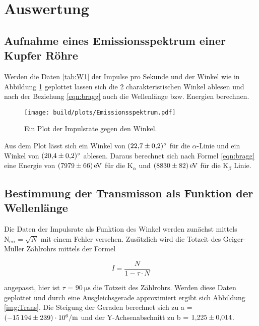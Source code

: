 \section{Auswertung}

    \subsection{Aufnahme eines Emissionsspektrum einer Kupfer Röhre}

        \noindent Werden die Daten \ref{tab:W1} der Impulse pro Sekunde und der Winkel wie in Abbildung \ref{img:Spekt} geplottet lassen sich die 2 
        charakteristischen Winkel ablesen und nach der Beziehung \ref{eqn:bragg} auch die Wellenlänge bzw. Energien berechnen.

            \begin{figure}
                \centering
                \texttt{[image: build/plots/Emissionsspektrum.pdf]}
                \caption{Ein Plot der Impulsrate gegen den Winkel.}
                \label{img:Spekt}
            \end{figure}

        \noindent Aus dem Plot lässt sich ein Winkel von $\SI{22.7 \pm 0.2}{\degree}$ für die $\alpha$-Linie und ein Winkel von $\SI{20.4 \pm 0.2}{\degree}$
        ablesen. Daraus berechnet sich nach Formel \ref{eqn:bragg} eine Energie von $\SI{7979 \pm 66}{\electronvolt}$ für die $\text{K}_{\alpha}$ und
        $\SI{8830 \pm 82}{\electronvolt}$ für die $\text{K}_{\beta}$ Linie. 

    \subsection{Bestimmung der Transmisson als Funktion der Wellenlänge}

        \noindent Die Daten der Impulsrate als Funktion des Winkel werden zunächst mittels $\text{N}_{\text{err}}=\sqrt{N}$ mit einem Fehler versehen.
        Zusätzlich wird die Totzeit des Geiger-Müller Zählrohrs mittels der Formel 
        
            \begin{equation}
                I = \frac{N}{1 - \tau \cdot N}
            \end{equation}
        
        \noindent angepasst, hier ist $\tau$ = $\SI{90}{\micro\second}$ die Totzeit des Zählrohrs. Werden diese Daten geplottet und durch eine 
        Ausgleichsgerade approximiert ergibt sich Abbildung \ref{img:Trans}. Die Steigung der Geraden berechnet sich zu 
        a = $\SI{-15194  (239)e6}{\per\meter}$ und der Y-Achsenabschnitt zu b = $\num{1.225 \pm 0.014}$.

